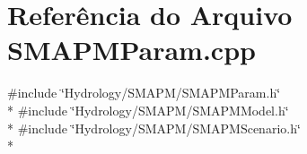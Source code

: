 \section{Referência do Arquivo S\+M\+A\+P\+M\+Param.\+cpp}
\label{_s_m_a_p_m_param_8cpp}
{\ttfamily \#include \char`\"{}Hydrology/\+S\+M\+A\+P\+M/\+S\+M\+A\+P\+M\+Param.\+h\char`\"{}}\\*
{\ttfamily \#include \char`\"{}Hydrology/\+S\+M\+A\+P\+M/\+S\+M\+A\+P\+M\+Model.\+h\char`\"{}}\\*
{\ttfamily \#include \char`\"{}Hydrology/\+S\+M\+A\+P\+M/\+S\+M\+A\+P\+M\+Scenario.\+h\char`\"{}}\\*
